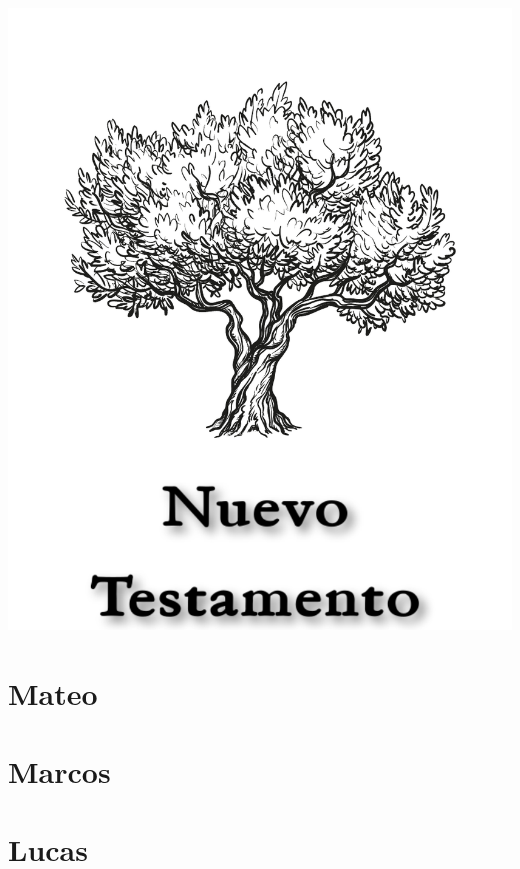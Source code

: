 \null\vfill
\begin{center}
\begin{minipage}[c]{\textwidth}
  \begin{center}
  \includegraphics{NuevoTestamentoTitulo.pdf}
  \end{center}
\end{minipage}
\end{center}
\null\vfill
\newpage

\pagestyle{bible}

\chapter{Mateo}



\chapter{Marcos}



\chapter{Lucas}




